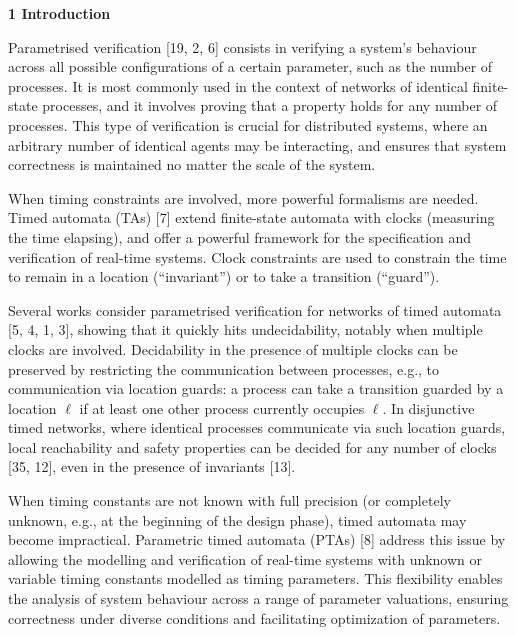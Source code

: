 
 
\par\medskip\noindent\textbf{1 Introduction}\par
 
 
Parametrised verification [19, 2, 6] consists in verifying a system’s behaviour across all possible configurations of a certain parameter, such as the number of processes. It is most commonly used in the context of networks of identical finite-state processes, and it involves proving that a property holds for any number of processes. This type of verification is crucial for distributed systems, where an arbitrary number of identical agents may be interacting, and ensures that system correctness is maintained no matter the scale of the system.\par
 
 
 
When timing constraints are involved, more powerful formalisms are needed. Timed automata (TAs) [7] extend finite-state automata with clocks (measuring the time elapsing), and offer a powerful framework for the specification and verification of real-time systems. Clock constraints are used to constrain the time to remain in a location (“invariant”) or to take a transition (“guard”).\par
 
 
 
Several works consider parametrised verification for networks of timed automata [5, 4, 1, 3], showing that it quickly hits undecidability, notably when multiple clocks are involved. Decidability in the presence of multiple clocks can be preserved by restricting the communication between processes, e.g., to communication via location guards: a process can take a transition guarded by a location $\mathrm{\ell}$ if at least one other process currently occupies $\mathrm{\ell}$. In disjunctive timed networks, where identical processes communicate via such location guards, local reachability and safety properties can be decided for any number of clocks [35, 12], even in the presence of invariants [13].\par
 
 
 
When timing constants are not known with full precision (or completely unknown, e.g., at the beginning of the design phase), timed automata may become impractical. Parametric timed automata (PTAs) [8] address this issue by allowing the modelling and verification of real-time systems with unknown or variable timing constants modelled as timing parameters. This flexibility enables the analysis of system behaviour across a range of parameter valuations, ensuring correctness under diverse conditions and facilitating optimization of parameters.\par
 
